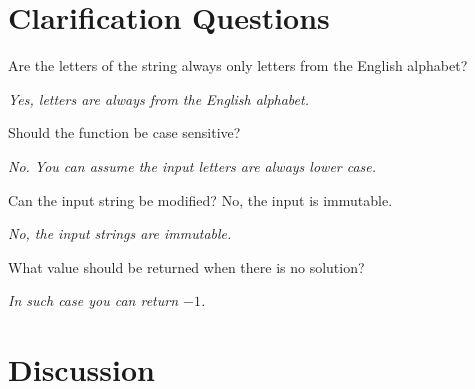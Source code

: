 \section{Clarification Questions}

\begin{QandA}
	\item \begin{questionitem} \begin{question} Are the letters of the string always only letters from the English alphabet?    \end{question} 	 
    \begin{answered}
		\textit{Yes, letters are always from the English alphabet.}
	\end{answered} \end{questionitem}
	
	\item \begin{questionitem} \begin{question} Should the function be case sensitive?   \end{question} 	 
    \begin{answered}
		\textit{ No. You can assume the input letters are always lower case.}
	\end{answered} \end{questionitem}
	\item \begin{questionitem} \begin{question} Can the input string be modified? No, the input is immutable.  \end{question} 	 
    \begin{answered}
		\textit{No, the input strings are immutable.}
	\end{answered} \end{questionitem}

	\item \begin{questionitem} \begin{question} What value should be returned when there is no solution?  \end{question} 	 
    \begin{answered}
		\textit{In such case you can return $-1$.}
	\end{answered} \end{questionitem}
\end{QandA}

\section{Discussion}

